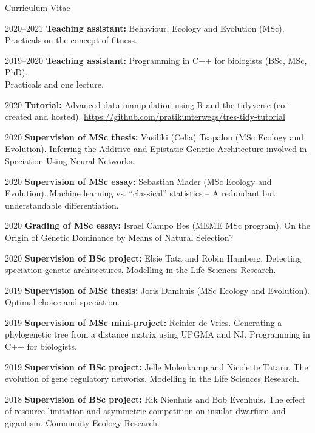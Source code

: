 \documentclass[11pt,a4paper]{article}
\begin{document}
\begin{cv}{Curriculum Vitae}
\begin{cvlist}{}
			\item[2020--2021] \textbf{Teaching assistant:} Behaviour, Ecology and Evolution (MSc).\\
			Practicals on the concept of fitness. 
			
			\item[2019--2020] \textbf{Teaching assistant:} Programming in C++ for biologists (BSc, MSc, PhD).\\ Practicals and one lecture. 
			
			\item[2020] \textbf{Tutorial:} Advanced data manipulation using R and the tidyverse (co-created and hosted). \url{https://github.com/pratikunterwegs/tres-tidy-tutorial}
			
			\item[2020] \textbf{Supervision of MSc thesis:} Vasiliki (Celia) Tsapalou (MSc Ecology and Evolution).
			Inferring the Additive and Epistatic Genetic Architecture involved in Speciation Using Neural Networks.
			
			\item[2020] \textbf{Supervision of MSc essay:} Sebastian Mader (MSc Ecology and Evolution).
			Machine learning vs. “classical” statistics – A redundant but understandable differentiation.
			
			\item[2020] \textbf{Grading of MSc essay:} Israel Campo Bes (MEME MSc program).
			On the Origin of Genetic Dominance by Means of Natural Selection?
			
			\item[2020] \textbf{Supervision of BSc project:} Elsie Tata and Robin Hamberg.
			Detecting speciation genetic architectures. Modelling in the Life Sciences Research.
			
			\item[2019] \textbf{Supervision of MSc thesis:} Joris Damhuis (MSc Ecology and Evolution).
			Optimal choice and speciation.
			
			\item[2019] \textbf{Supervision of MSc mini-project:} Reinier de Vries.
			Generating a phylogenetic tree from a distance matrix using UPGMA and NJ. Programming in C++ for biologists.
	
			\item[2019] \textbf{Supervision of BSc project:} Jelle Molenkamp and Nicolette Tataru. The evolution of gene regulatory networks. Modelling in the Life Sciences Research.
			
			\item[2018] \textbf{Supervision of BSc project:} Rik Nienhuis and Bob Evenhuis. The effect of resource limitation and asymmetric competition on insular dwarfism and gigantism. Community Ecology Research.		
			

\end{cvlist}
\end{cv}
\end{document}
